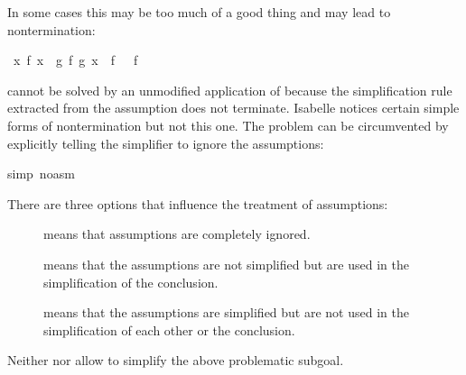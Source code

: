 \begin{isabellebody}
\begin{isamarkuptext}
In some cases this may be too much of a good thing and may lead to
nontermination:%
\end{isamarkuptext}%
\ {\isachardoublequote}{\isasymforall}x{\isachardot}\ f\ x\ {\isacharequal}\ g\ {\isacharparenleft}f\ {\isacharparenleft}g\ x{\isacharparenright}{\isacharparenright}\ {\isasymLongrightarrow}\ f\ {\isacharbrackleft}{\isacharbrackright}\ {\isacharequal}\ f\ {\isacharbrackleft}{\isacharbrackright}\ {\isacharat}\ {\isacharbrackleft}{\isacharbrackright}{\isachardoublequote}%
\begin{isamarkuptxt}%
\noindent
cannot be solved by an unmodified application of  because the
simplification rule  extracted from the assumption
does not terminate. Isabelle notices certain simple forms of
nontermination but not this one. The problem can be circumvented by
explicitly telling the simplifier to ignore the assumptions:%
\end{isamarkuptxt}%
simp\ {\isacharparenleft}no{\isacharunderscore}asm{\isacharparenright}{\isacharparenright}\isanewline
{}%
\begin{isamarkuptext}%
\noindent
There are three options that influence the treatment of assumptions:
\begin{description}
\item[]
 means that assumptions are completely ignored.
\item[]
 means that the assumptions are not simplified but
  are used in the simplification of the conclusion.
\item[]
 means that the assumptions are simplified but are not
  used in the simplification of each other or the conclusion.
\end{description}
Neither  nor  allow to simplify
the above problematic subgoal.


\end{isamarkuptext}
\end{isabellebody}
